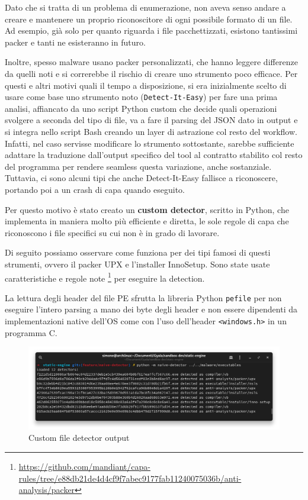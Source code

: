 Dato che si tratta di un problema di enumerazione, non aveva senso andare a creare e mantenere un proprio riconoscitore di ogni possibile formato di un file. Ad esempio, già solo per quanto riguarda i file pacchettizzati, esistono tantissimi packer e tanti ne esisteranno in futuro.

Inoltre, spesso malware usano packer personalizzati, che hanno leggere differenze da quelli noti e si correrebbe il rischio di creare uno strumento poco efficace.
Per questi e altri motivi quali il tempo a disposizione, si era inizialmente scelto di usare come base uno strumento noto (\texttt{Detect-It-Easy}) per fare una prima analisi, affiancato da uno script Python custom che decide quali operazioni svolgere a seconda del tipo di file, va a fare il parsing del JSON dato in output e si integra nello script Bash creando un layer di astrazione col resto del workflow.
Infatti, nel caso servisse modificare lo strumento sottostante, sarebbe sufficiente adattare la traduzione dall'output specifico del tool al contratto stabilito col resto del programma per rendere seamless questa variazione, anche sostanziale.
Tuttavia, ci sono alcuni tipi che anche Detect-It-Easy fallisce a riconoscere, portando poi a un crash di capa quando eseguito.

Per questo motivo è stato creato un \textbf{custom detector}, scritto in Python, che implementa in maniera molto più efficiente e diretta, le sole regole di capa che riconoscono i file specifici su cui non è in grado di lavorare.

Di seguito possiamo osservare come funziona per dei tipi famosi di questi strumenti, ovvero il packer UPX e l'installer InnoSetup.
Sono state usate caratteristiche e regole note
\footnote{\url{https://github.com/mandiant/capa-rules/tree/e88db21de4d4cf9f7abec9177fab11240075036b/anti-analysis/packer}}
per eseguire la detection.

La lettura degli header del file PE sfrutta la libreria Python \texttt{pefile} per non eseguire l'intero parsing a mano dei byte degli header e non essere dipendenti da implementazioni native dell'OS come con l'uso dell'header \texttt{<windows.h>} in un programma C.

\begin{figure}[!htb]
    \centering
    \includegraphics[width=\textwidth]{assets/custom_file_detector_output.png}
    \caption{Custom file detector output}
\end{figure}

